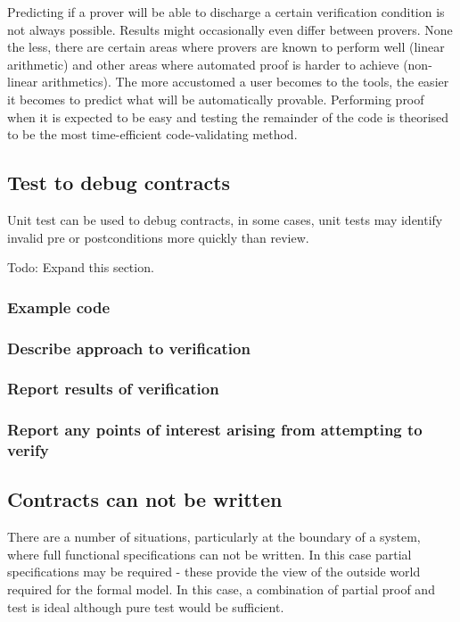 \documentclass{llncs}
\begin{document}
Predicting if a prover will be able to discharge a certain
verification condition is not always possible. Results might
occasionally even differ between provers. None the less, there are
certain areas where provers are known to perform well (linear
arithmetic) and other areas where automated proof is harder to achieve
(non-linear arithmetics). The more accustomed a user becomes to the
tools, the easier it becomes to predict what will be automatically
provable. Performing proof when it is expected to be easy and testing
the remainder of the code is theorised to be the most time-efficient
code-validating method.

\subsection{Test to debug contracts}
Unit test can be used to debug contracts, in some cases, unit tests
may identify invalid pre or postconditions more quickly than review.

Todo: Expand this section.

\subsubsection{Example code}
\subsubsection{Describe approach to verification}
\subsubsection{Report results of verification}
\subsubsection{Report any points of interest arising from attempting to verify}

\subsection{Contracts can not be written}

There are a number of situations, particularly at the boundary of a
system, where full functional specifications can not be written. In
this case partial specifications may be required - these provide the
view of the outside world required for the formal model. In this case,
a combination of partial proof and test is ideal although pure test
would be sufficient.
\end{document}
